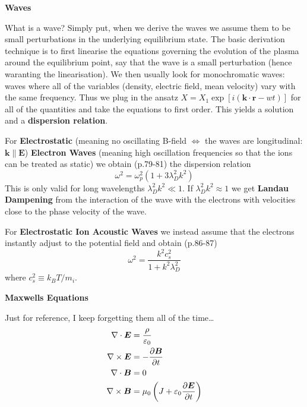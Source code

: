 \documentclass[10pt,landscape]{article}
\renewcommand{\vec}{\bm}
\newcommand{\topiccolor}{green}
\renewcommand{\section}[2]{%
	\renewcommand{\topiccolor}{#2}
	\begin{tcolorbox}[boxsep=0.5mm, left=1mm, right=1mm, top=0mm, bottom=0mm,
		colback=#2!30, colframe=#2, arc is angular]%
		\centering \textbf{#1}%
	\end{tcolorbox}%
	\nopagebreak%
}
\newcommand{\cbf}[1]{\textcolor{\topiccolor!80!black}{\textbf{#1}}}
\begin{document}
\begin{multicols*}{3}
\section{Waves}{red}

What is a wave?
Simply put, when we derive the waves we assume them to be small
perturbations in the underlying equilibrium state.
The basic derivation technique is
to first linearise the equations governing the evolution of the plasma
around the equilibrium point, say that the wave is a small perturbation
(hence waranting the linearisation).
We then usually look for monochromatic waves:
waves where all of the variables
(density, electric field, mean velocity)
vary with the same frequency.
Thus we plug in the ansatz $X = X_1 \exp[i(\vec k \cdot \vec r - w t)]$
for all of the quantities and take the equations to first order.
This yields a solution and a \cbf{dispersion relation}.

For \cbf{Electrostatic} (meaning no oscillating B-field $\iff$ the waves
are longitudinal: $\vec k \parallel \vec E$)
\cbf{Electron Waves} (meaning high oscillation frequencies so that the ions
can be treated as static) we obtain (p.79-81) the dispersion relation
\[
	\omega^2 = \omega_p^2 (1 + 3 \lambda_D^2 k^2)
\]
This is only valid for long wavelengths $\lambda_D^2 k^2 \ll 1$.
If $\lambda_D^2 k^2 \approx 1$ we get \cbf{Landau Dampening}
from the interaction of the wave with the electrons with velocities close to the
phase velocity of the wave.

For \cbf{Electrostatic Ion Acoustic Waves} we instead assume that the electrons
instantly adjust to the potential field and obtain (p.86-87)
\[
	\omega^2 = \frac{k^2 c_s^2}{1+k^2 \lambda_D^2}
\]
where $c_s^2 \equiv k_BT/m_i$.

\section{Maxwells Equations}{gray}

Just for reference, I keep forgetting them all of the time\ldots
\begin{align*}
	\nabla \cdot \vec E &= \frac{\rho}{\varepsilon_0}\\
	\nabla \times \vec E &= -\diffp{\vec B}{t}\\
	\nabla \cdot \vec B &= 0\\
	\nabla \times \vec B &= \mu_0\left(J + \varepsilon_0 \diffp{\vec E}{t}\right)
\end{align*}

\end{multicols*}
\end{document}
